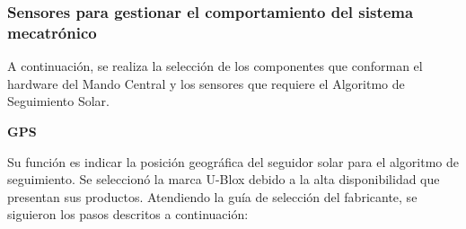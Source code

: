







\subsubsection{Sensores para gestionar el comportamiento del sistema mecatrónico} 
A continuación, se realiza la selección de los componentes que conforman el hardware del Mando Central y los sensores que requiere el Algoritmo de Seguimiento Solar.

\textbf{GPS}

Su función es indicar la posición geográfica del seguidor solar para el algoritmo de seguimiento. Se seleccionó la marca U-Blox debido a la alta disponibilidad que presentan sus productos. Atendiendo la guía de selección del fabricante, se siguieron los pasos descritos a continuación:

